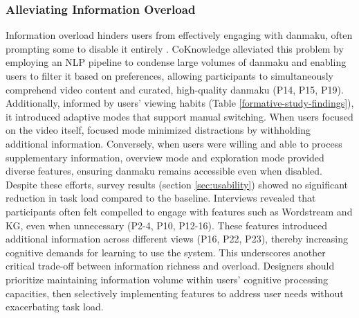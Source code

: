 \subsubsection{Alleviating Information Overload}
Information overload hinders users from effectively engaging with danmaku, often prompting some to disable it entirely \cite{ma2017video, wu2019danmaku, wu2018danmaku}. CoKnowledge alleviated this problem by employing an NLP pipeline to condense large volumes of danmaku and enabling users to filter it based on preferences, allowing participants to simultaneously comprehend video content and curated, high-quality danmaku (P14, P15, P19). Additionally, informed by users' viewing habits (Table \ref{formative-study-findings}), it introduced adaptive modes that support manual switching. When users focused on the video itself, focused mode minimized distractions by withholding additional information. Conversely, when users were willing and able to process supplementary information, overview mode and exploration mode provided diverse features, ensuring danmaku remains accessible even when disabled.
Despite these efforts, survey results (section \ref{sec:usability}) showed no significant reduction in task load compared to the baseline. Interviews revealed that participants often felt compelled to engage with features such as Wordstream and KG, even when unnecessary (P2-4, P10, P12-16). These features introduced additional information across different views (P16, P22, P23), thereby increasing cognitive demands for learning to use the system.
This underscores another critical trade-off between information richness and overload. Designers should prioritize maintaining information volume within users' cognitive processing capacities, then selectively implementing features to address user needs without exacerbating task load.



